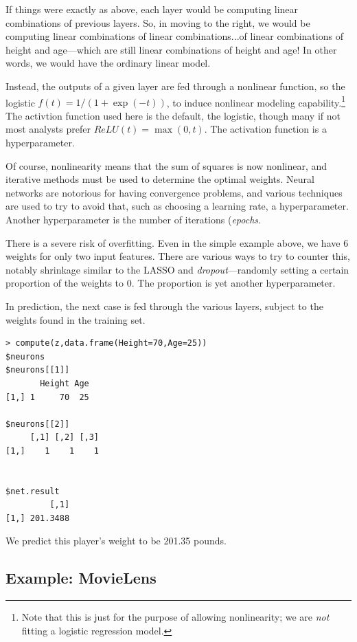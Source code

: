 If things were exactly as above, each layer would be computing linear
combinations of previous layers.  So, in moving to the right, we would
be computing linear combinations of linear combinations...of linear
combinations of height and age---which are still linear combinations of
height and age!  In other words, we would have the ordinary linear
model.  

Instead, the outputs of a given layer are fed through a nonlinear
function, so the logistic $f(t) = 1/(1+\exp({-t}))$, to induce nonlinear
modeling capability.\footnote{Note that this is just for the purpose of
allowing nonlinearity; we are \textit{not} fitting a logistic regression
model.}  The activtion function used here is the default, the logistic,
though many if not most analysts prefer $ReLU(t) = \max(0,t)$.  The
activation function is a hyperparameter.

Of course, nonlinearity means that the sum of squares is now nonlinear,
and iterative methods must be used to determine the optimal weights.
Neural networks are notorious for having convergence problems, and
various techniques are used to try to avoid that, such as choosing a
learning rate, a hyperparameter.  Another hyperparameter is the number
of iterations (\textit{epochs}.

There is a severe risk of overfitting.  Even in the simple example
above, we have 6 weights for only two input features.  There are various
ways to try to counter this, notably shrinkage similar to the LASSO and
\textit{dropout}---randomly setting a certain proportion of the weights
to 0.  The proportion is yet another hyperparameter.

In prediction, the next case is fed through the various layers, subject
to the weights found in the training set.

\begin{lstlisting}
> compute(z,data.frame(Height=70,Age=25))
$neurons
$neurons[[1]]
       Height Age
[1,] 1     70  25

$neurons[[2]]
     [,1] [,2] [,3]
[1,]    1    1    1


$net.result
         [,1]
[1,] 201.3488
\end{lstlisting}

We predict this player's weight to be 201.35 pounds.

\subsection{Example:  MovieLens}

